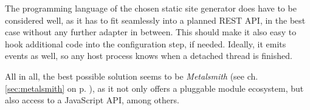 The programming language of the chosen static site generator does have to be considered well, as it has to fit seamlessly into a planned REST API, in the best case without any further adapter in between. This should make it also easy to hook additional code into the configuration step, if needed. Ideally, it emits events as well, so any host process knows when a detached thread is finished.

All in all, the best possible solution seems to be \emph{Metalsmith} (see ch. \ref{sec:metalsmith} on p. \pageref{sec:metalsmith}), as it not only offers a pluggable module ecosystem, but also access to a JavaScript API, among others. %
